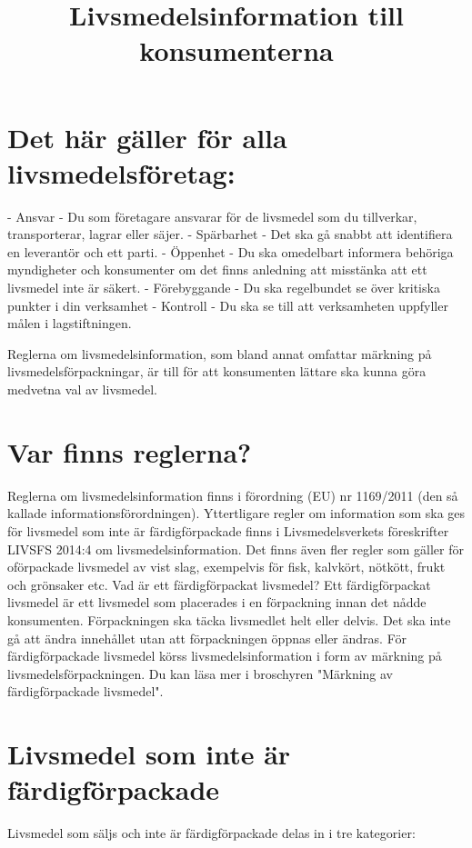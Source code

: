 \section*{Det här gäller för alla livsmedelsföretag:}
- Ansvar - Du som företagare ansvarar för de livsmedel som du tillverkar, transporterar, lagrar eller säjer.
- Spärbarhet - Det ska gå snabbt att identifiera en leverantör och ett parti.
- Öppenhet - Du ska omedelbart informera behöriga myndigheter och konsumenter om det finns anledning att misstänka att ett livsmedel inte är säkert.
- Förebyggande - Du ska regelbundet se över kritiska punkter i din verksamhet
- Kontroll - Du ska se till att verksamheten uppfyller målen i lagstiftningen.

\title{
Livsmedelsinformation till konsumenterna
}
Reglerna om livsmedelsinformation, som bland annat omfattar märkning på livsmedelsförpackningar, är till för att konsumenten lättare ska kunna göra medvetna val av livsmedel.
\section*{Var finns reglerna?}
Reglerna om livsmedelsinformation finns i förordning (EU) nr 1169/2011 (den så kallade informationsförordningen). Yttertligare regler om information som ska ges för livsmedel som inte är färdigförpackade finns i Livsmedelsverkets föreskrifter LIVSFS 2014:4 om livsmedelsinformation. Det finns även fler regler som gäller för oförpackade livsmedel av vist slag, exempelvis för fisk, kalvkört, nötkött, frukt och grönsaker etc.
Vad är ett färdigförpackat livsmedel?
Ett färdigförpackat livsmedel är ett livsmedel som placerades i en förpackning innan det nådde konsumenten. Förpackningen ska täcka livsmedlet helt eller delvis. Det ska inte gå att ändra innehållet utan att förpackningen öppnas eller ändras.
För färdigförpackade livsmedel körss livsmedelsinformation i form av märkning på livsmedelsförpackningen. Du kan läsa mer i broschyren "Märkning av färdigförpackade livsmedel".

\section*{Livsmedel som inte är färdigförpackade}
Livsmedel som säljs och inte är färdigförpackade delas in i tre kategorier:
